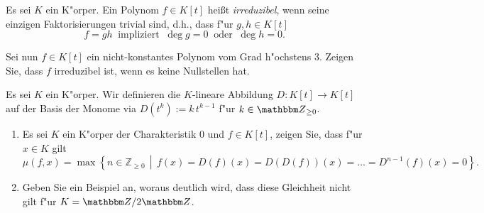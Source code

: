 \documentclass[a4,11pt]{article}
\begin{document}
\vspace*{-17mm}
{
\kopf
}


\begin{aufgabe}[4 Punkte]
Es sei $K$ ein K"orper. Ein Polynom $f\in K[t]$ heißt
\emph{irreduzibel}, wenn seine einzigen Faktorisierungen trivial sind,
d.h., dass f"ur $g,h \in K[t]$
\[
f = gh \ \text{ impliziert } \ \deg g = 0 \ \text{ oder } \ \deg h = 0.
\]


Sei nun $f\in K[t]$ ein nicht-konstantes Polynom
vom Grad h"ochstens $3$. Zeigen Sie, dass $f$ irreduzibel ist, wenn es
keine Nullstellen hat.

\end{aufgabe}

\begin{aufgabe}[4 Punkte]
Es sei $K$ ein K"orper. Wir definieren die $K$-lineare Abbildung $D
\colon K[t] \to K[t]$ auf der Basis der Monome via $D(t^k) := k\,t^{k-1}$
f"ur $k \in \Z_{\ge 0}$. 
  
\begin{enumerate}
\item Es sei $K$ ein K"orper der Charakteristik $0$ und $f \in K[t]$, zeigen Sie, dass f"ur $x\in K$ gilt
\[
\mu(f,x) = \max \left\{ n \in \mathbb{Z}_{\geq 0} \,\middle|\, f(x) = D(f)(x) =
D(D(f))(x) = \ldots = D^{n-1}(f)(x) = 0 \right\}.
\]
\item Geben Sie ein Beispiel an, woraus deutlich wird, dass diese Gleichheit nicht gilt f"ur $K = \Z/2\Z$.
\end{enumerate}

\end{aufgabe}
\end{document}
